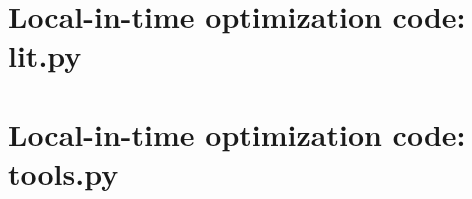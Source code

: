 
\section{Local-in-time optimization code: lit.py}



\section{Local-in-time optimization code: tools.py}


